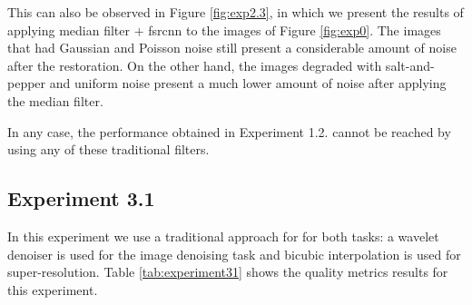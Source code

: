 This can also be observed in Figure \ref{fig:exp2.3}, in which we present the results of applying median filter $+$ \gls{fsrcnn} to the images of Figure \ref{fig:exp0}. The images that had Gaussian and Poisson noise still present a considerable amount of noise after the restoration. On the other hand, the images degraded with salt-and-pepper and uniform noise present a much lower amount of noise after applying the median filter. 

In any case, the performance obtained in Experiment 1.2. cannot be reached by using any of these traditional filters.

\newpage\subsection{Experiment 3.1}
In this experiment we use a traditional approach for for both tasks: a wavelet denoiser is used for the image denoising task and bicubic interpolation is used for super-resolution. Table \ref{tab:experiment31} shows the quality metrics results for this experiment.

